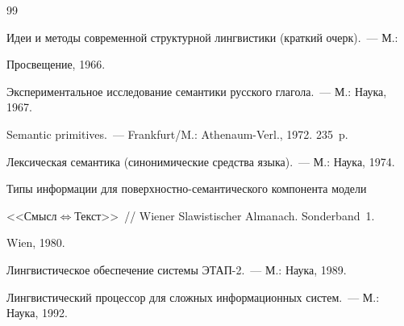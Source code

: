 {{\begin{thebibliography}{99}




Идеи и методы современной структурной лингвистики (краткий очерк).~--- М.: 


Просвещение, 1966.









Экспериментальное исследование семантики русского глагола.~--- М.: Наука, 1967.









Semantic primitives.~--- Frankfurt/M.: Athenaum-Verl., 1972. 235~p.






Лексическая семантика (синонимические средства языка).~--- М.: Наука, 1974. 









Типы информации для поверхностно-семантического компонента модели 


<<Смысл\;$\Leftrightarrow$\;Текст>>~/\!\!/ Wiener Slawistischer Almanach. Sonderband~1. 


Wien, 1980. 









Лингвистическое обеспечение системы ЭТАП-2.~--- М.: Наука, 1989.









Лингвистический процессор для сложных информационных систем.~--- М.: Наука, 1992.










\end{thebibliography}}}
